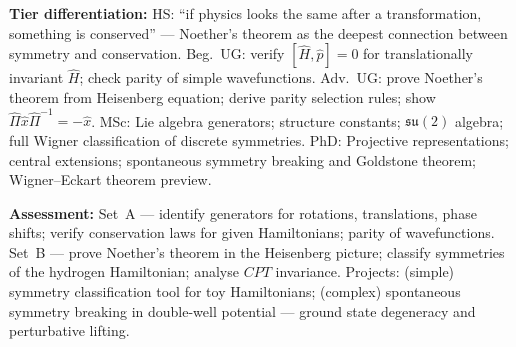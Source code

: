 \documentclass[11pt,a4paper]{article}
\begin{document}
\begin{tcolorbox}[modulebox, title={Module~I.3 --- Lecture L04: Infinitesimal Generators, Symmetries, and Noether's Theorem}]
\medskip\textbf{Tier differentiation:}
HS: ``if physics looks the same after a transformation, something is conserved'' ---
Noether's theorem as the deepest connection between symmetry and conservation.
Beg.\ UG: verify $[\hat{H},\hat{p}]=0$ for translationally invariant $\hat{H}$;
check parity of simple wavefunctions.
Adv.\ UG: prove Noether's theorem from Heisenberg equation;
derive parity selection rules; show $\hat{\Pi}\hat{x}\hat{\Pi}^{-1}=-\hat{x}$.
MSc: Lie algebra generators; structure constants; $\mathfrak{su}(2)$ algebra;
full Wigner classification of discrete symmetries.
PhD: Projective representations; central extensions; spontaneous symmetry breaking
and Goldstone theorem; Wigner--Eckart theorem preview.

\medskip\textbf{Assessment:}
Set~A --- identify generators for rotations, translations, phase shifts;
verify conservation laws for given Hamiltonians; parity of wavefunctions.
Set~B --- prove Noether's theorem in the Heisenberg picture;
classify symmetries of the hydrogen Hamiltonian; analyse $CPT$ invariance.
Projects: (simple) symmetry classification tool for toy Hamiltonians;
(complex) spontaneous symmetry breaking in double-well potential ---
ground state degeneracy and perturbative lifting.
\end{tcolorbox}
\end{document}
